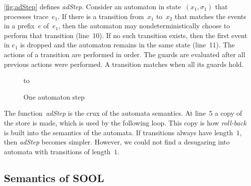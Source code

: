 \documentclass[preprint]{sigplanconf} %
\theoremstyle{definition}
\theoremstyle{remark}
\begin{document}
\autoref{fig:adStep} defines \textit{adStep}.
Consider an automaton in state~$(x_1,\sigma_1)$ that processes trace~$e_1$.
If there is a transition from~$x_1$ to~$x_2$ that matches the events in a prefix~$e$ of~$e_1$, then the automaton may nondeterministically choose to perform that transition (line~10).
If no such transition exists, then the first event in $e_1$ is dropped and the automaton remains in the same state (line~11).
The actions of a transition are performed in order.
The guards are evaluated after all previous actions were performed.
A transition matches when all its guards hold.

\begin{figure}
\hbox to
\caption{One automaton step}
\label{fig:adStep}
\end{figure}

The function~\textit{adStep} is the crux of the automata semantics.
At line~5 a copy of the store is made, which is used by the following loop.
This copy is how \emph{roll-back} is built into the semantics of the automata.
If transitions always have length~$1$, then \textit{adStep} becomes simpler.
However, we could not find a desugaring into automata with transitions of length~$1$.

\subsection{Semantics of SOOL} \label{sec:semantics.sool} %
\end{document}
